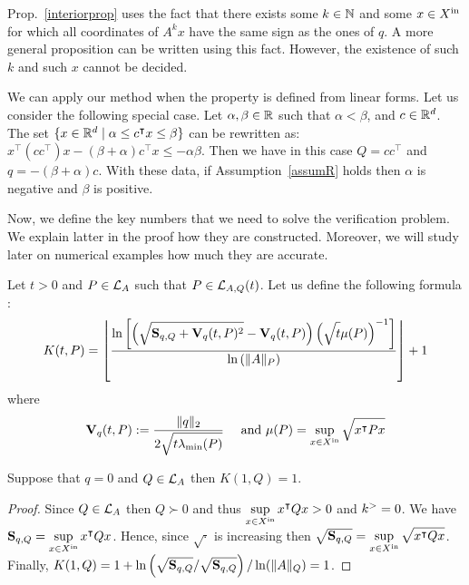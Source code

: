 \documentclass[10pt]{article}
\begin{document}
Prop.~\ref{interiorprop} uses the fact that there exists some $k\in\mathbb{N}$ and some $x\in X^\mathrm{in}$ for which all coordinates of $A^k x$ have the same sign as the ones of $q$. A more general proposition can be written using this fact. However, the existence of such $k$ and such $x$ cannot be decided.     
 
\begin{remark}
\label{remarklinear}
We can apply our method when the property is defined from linear forms. 
Let us consider the following special case. Let $\alpha,\beta\in\mathbb R$ such that $\alpha<\beta$, and $c\in\mathbb R^d$. The set $\{x\in\mathbb R^d \mid \alpha \leq c^\intercal x\leq \beta\}$ can be rewritten as:
$x^\intercal (c c^\intercal) x-(\beta+\alpha) c^\intercal x \leq -\alpha \beta$. Then we have in this case $Q=c c^\intercal$ and $q= -(\beta+\alpha) c$. With these data, if Assumption~\ref{assumR} holds then $\alpha$ is negative and $\beta$ is positive. 
\end{remark}

Now, we define the key numbers that we need to solve the verification problem. We explain latter in the proof how they are constructed. Moreover, we will study later on numerical examples how much they are accurate.  


Let $t>0$ and $P\in\mathcal{L}_{A}$ such that $P\in \mathcal{L}_{A,Q}(t)$. Let us define the following formula :
\begin{equation}
\label{intgfond}
K(t,P)=\left\lfloor \dfrac{\ln\left[\left(\sqrt{\strut \mathbf{S}_{q,Q}+\mathbf{V}_{q}(t,P)^2}-\mathbf{V}_{q}(t,P)\right)\left(\sqrt{\strut t}\mu(P)\right)^{-1}\right]}{\ln\left(\| A\|_P\right)}\right\rfloor+1
\end{equation}
where 
\[
\mathbf{V}_{q}(t,P):=\dfrac{\| q\|_2 }{2\sqrt{\strut t\lambda_{\operatorname{min}}(P)}}\quad \text{ and } \mu(P)=\sup_{x\in X^\mathrm{in}} \sqrt{\strut x^\intercal P x}
\]

\begin{prop}
\label{lyapunovbigk}
Suppose that $q=0$ and $Q\in\mathcal{L}_{A}$ then $K(1,Q)=1$.  
\end{prop}

\begin{proof}
Since $Q\in\mathcal{L}_{A}$ then $Q\succ 0$ and thus $\displaystyle{\sup_{x\in X^\mathrm{in}} x^\intercal Q x>0}$ and $k^{>}=0$. We have $\mathbf{S}_{q,Q}=\displaystyle{\sup_{x\in X^\mathrm{in}} x^\intercal Q x}$. Hence, since 
$\sqrt{\cdot}$ is increasing then $\sqrt{\mathbf{S}_{q,Q}}=\displaystyle{\sup_{x\in X^\mathrm{in}} \sqrt{x^\intercal Q x}}$. Finally, $K(1,Q)=1+\displaystyle{\ln\left(\sqrt{\mathbf{S}_{q,Q}}/\sqrt{\mathbf{S}_{q,Q}}\right) / \ln(\| A\|_Q)}=1$.
\end{proof}
\end{document}
